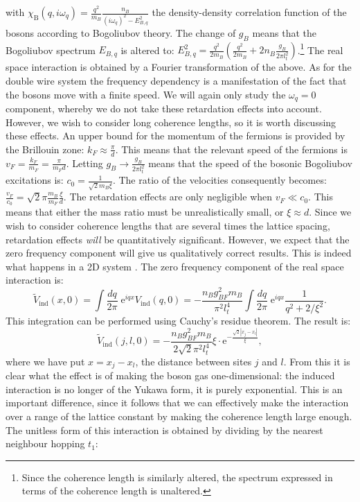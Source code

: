 with $\chi_\text{B}(q, i\omega_q) = \frac{q^2}{m_B}\frac{n_B}{(i\omega_q)^2 - E_{B,q}^2}$ the density-density correlation function of the bosons according to Bogoliubov theory. The change of $g_B$ means that the Bogoliubov spectrum $E_{B,q}$ is altered to: $E_{B,q}^2 = \frac{q^2}{2m_B}\left(\frac{q^2}{2m_B} + 2n_B\frac{g_B}{2\pi l_t^2}\right)$.\footnote{Since the coherence length is similarly altered, the spectrum expressed in terms of the coherence length is unaltered.} The real space interaction is obtained by a Fourier transformation of the above. As for the double wire system the frequency dependency is a manifestation of the fact that the bosons move with a finite speed. We will again only study the $\omega_q = 0$ component, whereby we do not take these retardation effects into account. However, we wish to consider long coherence lengths, so it is worth discussing these effects. An upper bound for the momentum of the fermions is provided by the Brillouin zone: $k_F \approx \frac{\pi}{d}$. This means that the relevant speed of the fermions is $v_F = \frac{k_F}{m_F} = \frac{\pi}{m_Fd}$. Letting $g_B \to \frac{g_B}{2\pi l_t^2}$ means that the speed of the bosonic Bogoliubov excitations is: $c_0 = \frac{1}{\sqrt{2}m_B\xi}$. The ratio of the velocities consequently becomes: $\frac{v_F}{c_0} = \sqrt{2}\pi\frac{m_B}{m_F}\frac{\xi}{d}$. The retardation effects are only negligible when $v_F\ll c_0$. This means that either the mass ratio must be unrealistically small, or $\xi \approx d$. Since we wish to consider coherence lengths that are several times the lattice spacing, retardation effects \textit{will} be quantitatively significant. However, we expect that the zero frequency component will give us qualitatively correct results. This is indeed what happens in a 2D system \cite{Jonatan.LatticeFermionsIn3DBEC}. The zero frequency component of the real space interaction is:
\begin{equation}
\tilde{V}_{\text{ind}}(x, 0) = \int \frac{dq}{2\pi} \; \text{e}^{iqx}V_{\text{ind}}(q, 0) = -\frac{n_Bg_{BF}^2m_B}{\pi^2l_t^4}\int \frac{dq}{2\pi} \; \text{e}^{iqx} \frac{1}{q^2 + 2/\xi^2}. \nonumber
\end{equation}
This integration can be performed using Cauchy's residue theorem. The result is:
\begin{equation}
\tilde{V}_{\text{ind}}(j, l, 0) = -\frac{n_Bg_{BF}^2m_B}{2\sqrt{2}\pi^2l_t^4}\xi \cdot \text{e}^{-\frac{\sqrt{2}|x_j - x_l|}{\xi}},
\label{eq.Inducedcinteractionrealspace.kitaevchain}
\end{equation}
where we have put $x = x_j - x_l$, the distance between sites $j$ and $l$. From this it is clear what the effect is of making the boson gas one-dimensional: the induced interaction is no longer of the Yukawa form, it is purely exponential. This is an important difference, since it follows that we can effectively make the interaction over a range of the lattice constant by making the coherence length large enough. The unitless form of this interaction is obtained by dividing by the nearest neighbour hopping $t_1$:
